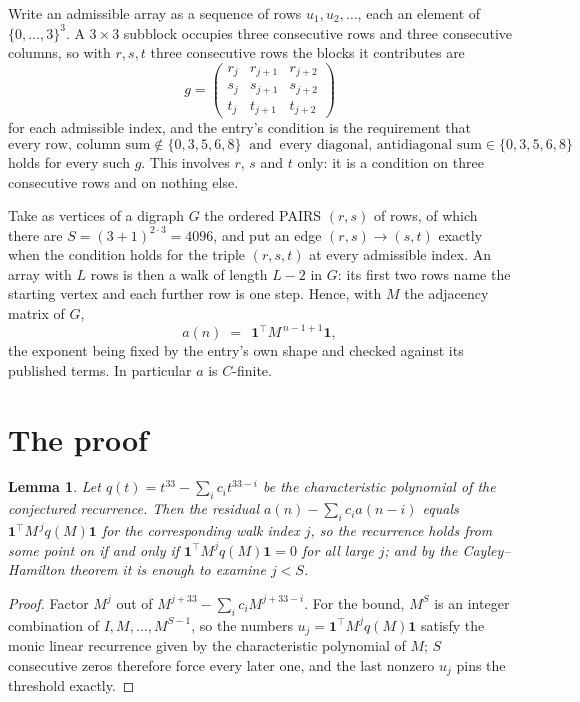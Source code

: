 \documentclass[11pt,a4paper]{article}
\theoremstyle{plain}
\newtheorem{lemma}[theorem]{Lemma}
\theoremstyle{definition}
\begin{document}
Write an admissible array as a sequence of rows $u_1,u_2,\dots$, each an element of
$\{0,\dots,3\}^{3}$. A $3\times3$ subblock occupies three consecutive rows and
three consecutive columns, so with $r,s,t$ three consecutive rows the blocks it
contributes are
\[
g=\begin{pmatrix}r_j&r_{j+1}&r_{j+2}\\ s_j&s_{j+1}&s_{j+2}\\ t_j&t_{j+1}&t_{j+2}\end{pmatrix}
\]
for each admissible index, and the entry's condition is the requirement that
\[
\text{every row, column sum} \notin \{0,3,5,6,8\}\ \text{ and }\ \text{every diagonal, antidiagonal sum} \in \{0,3,5,6,8\}
\]
holds for every such $g$. This involves $r$, $s$ and $t$ only: it is a condition on
three consecutive rows and on nothing else.

Take as vertices of a digraph $G$ the ordered PAIRS $(r,s)$ of rows, of which there are
$S=(3+1)^{2\cdot3}=4096$, and put an edge $(r,s)\to(s,t)$ exactly when the condition
holds for the triple $(r,s,t)$ at every admissible index. An array with $L$ rows is then a
walk of length $L-2$ in $G$: its first two rows name the starting vertex and each further
row is one step. Hence, with $M$ the adjacency matrix of $G$,
\[
a(n)\;=\;\,\mathbf{1}^{\!\top}M^{\,n-1+1}\mathbf{1},
\]
the exponent being fixed by the entry's own shape and checked against its published terms.
In particular $a$ is $C$-finite.

\section{The proof}

\begin{lemma}\label{lem:crit}
Let $q(t)=t^{33}-\sum_i c_it^{33-i}$ be the characteristic polynomial of the
conjectured recurrence. Then the residual $a(n)-\sum_ic_ia(n-i)$ equals
$\mathbf{1}^{\!\top}M^{\,j}q(M)\mathbf{1}$ for the corresponding walk index
$j$, so the recurrence holds from some point on if and only if
$\mathbf{1}^{\!\top}M^{j}q(M)\mathbf{1}=0$ for all large $j$; and by the
Cayley--Hamilton theorem it is enough to examine $j<S$.
\end{lemma}

\begin{proof}
Factor $M^{j}$ out of $M^{j+33}-\sum_ic_iM^{j+33-i}$. For the bound, $M^{S}$
is an integer combination of $I,M,\dots,M^{S-1}$, so the numbers
$u_j=\mathbf{1}^{\!\top}M^{j}q(M)\mathbf{1}$ satisfy the monic linear recurrence given by
the characteristic polynomial of $M$; $S$ consecutive zeros therefore force every later one,
and the last nonzero $u_j$ pins the threshold exactly.
\end{proof}
\end{document}
